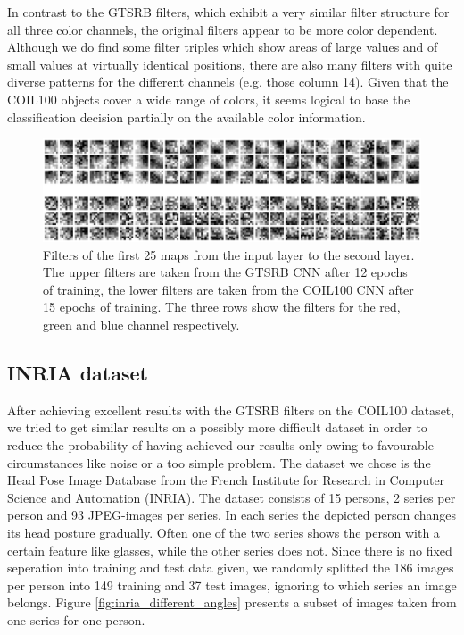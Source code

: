 \documentclass[11pt, a4paper]{article}
\begin{document}
In contrast to the GTSRB filters, which exhibit a very similar filter structure for all three color channels, the original filters appear to be more color dependent. Although we do find some filter triples which show areas of large values and of small values at virtually identical positions, there are also many filters with quite diverse patterns for the different channels (e.g. those column 14). Given that the COIL100 objects cover a wide range of colors, it seems logical to base the classification decision partially on the available color information.

\begin{figure}[h!]
	\centering
	\includegraphics[width=1\textwidth]{gtsrb_vs_coil_filters.png}
	\caption{Filters of the first 25 maps from the input layer to the second layer. The upper filters are taken from the GTSRB CNN after 12 epochs of training, the lower filters are taken from the COIL100 CNN after 15 epochs of training. The three rows show the filters for the red, green and blue channel respectively.}
	\label{fig:gtsrb_vs_coil_filters}
\end{figure}


\subsection{INRIA dataset}
\label{subsec:inria}

After achieving excellent results with the GTSRB filters on the COIL100 dataset, we tried to get similar results on a possibly more difficult dataset in order to reduce the probability of having achieved our results only owing to favourable circumstances like noise or a too simple problem. The dataset we chose is the Head Pose Image Database \cite{estimating-face-orientation-inria} from the French Institute for Research in Computer Science and Automation (INRIA). The dataset consists of 15 persons, 2 series per person and 93 JPEG-images per series. In each series the depicted person changes its head posture gradually. Often one of the two series shows the person with a certain feature like glasses, while the other series does not. Since there is no fixed seperation into training and test data given, we randomly splitted the 186 images per person into 149 training and 37 test images, ignoring to which series an image belongs. Figure \ref{fig:inria_different_angles} presents a subset of images taken from one series for one person.
\end{document}
